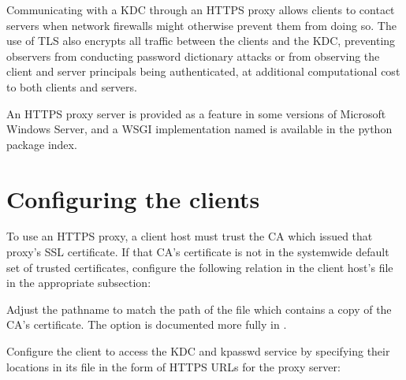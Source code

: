 \documentclass[letterpaper,10pt,english]{sphinxmanual}
\begin{document}
\sphinxAtStartPar
Communicating with a KDC through an HTTPS proxy allows clients to
contact servers when network firewalls might otherwise prevent them
from doing so.  The use of TLS also encrypts all traffic between the
clients and the KDC, preventing observers from conducting password
dictionary attacks or from observing the client and server principals
being authenticated, at additional computational cost to both clients
and servers.

\sphinxAtStartPar
An HTTPS proxy server is provided as a feature in some versions of
Microsoft Windows Server, and a WSGI implementation named 
is available in the python package index.


\section{Configuring the clients}
\label{\detokenize{admin/https:configuring-the-clients}}
\sphinxAtStartPar
To use an HTTPS proxy, a client host must trust the CA which issued
that proxy’s SSL certificate.  If that CA’s certificate is not in the
system\sphinxhyphen{}wide default set of trusted certificates, configure the
following relation in the client host’s {\hyperref[\detokenize{admin/conf_files/krb5_conf:krb5-conf-5}]{}} file in
the appropriate {\hyperref[\detokenize{admin/conf_files/krb5_conf:realms}]{}} subsection:

\begin{sphinxVerbatim}[commandchars=\\\{\}]
  
\end{sphinxVerbatim}

\sphinxAtStartPar
Adjust the pathname to match the path of the file which contains a
copy of the CA’s certificate.  The  option is documented
more fully in {\hyperref[\detokenize{admin/conf_files/krb5_conf:krb5-conf-5}]{}}.

\sphinxAtStartPar
Configure the client to access the KDC and kpasswd service by
specifying their locations in its {\hyperref[\detokenize{admin/conf_files/krb5_conf:krb5-conf-5}]{}} file in the form
of HTTPS URLs for the proxy server:
\end{document}
